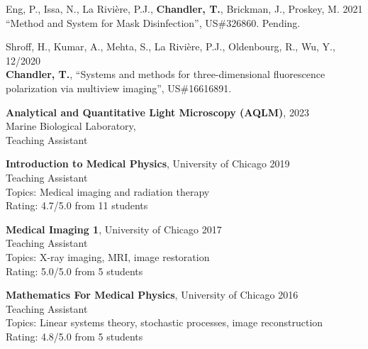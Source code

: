 \documentclass[12pt,letterpaper]{article}
\begin{document}
\begin{benumerate}{2}
  \item{Eng, P., Issa, N., La Rivi\`ere, P.J., \textbf{Chandler, T.}, Brickman, J., Proskey, M. \hfill 2021\\ ``Method and System for Mask Disinfection'', US\#326860. Pending. }
\item{Shroff, H., Kumar, A., Mehta, S., La Rivi\`ere, P.J., Oldenbourg, R., Wu, Y., \hfill 12/2020\\ \textbf{Chandler, T.}, ``Systems and methods for three-dimensional fluorescence\\ polarization via multiview imaging'', US\#16616891.}
\end{benumerate}

\begin{benumerate}{4}
\item
  \textbf{Analytical and Quantitative Light Microscopy (AQLM)}, \hfill 2023\\
  Marine Biological Laboratory,\\
  Teaching Assistant

\item
  \textbf{Introduction to Medical Physics}, University of Chicago \hfill 2019\\
  Teaching Assistant\\
  Topics: Medical imaging and radiation therapy\\
  Rating: 4.7/5.0 from 11 students
\item
  \textbf{Medical Imaging 1}, University of Chicago \hfill 2017\\
  Teaching Assistant\\
  Topics: X-ray imaging, MRI, image restoration\\
  Rating: 5.0/5.0 from 5 students
\item
  \textbf{Mathematics For Medical Physics}, University of Chicago \hfill 2016\\
  Teaching Assistant\\
  Topics: Linear systems theory, stochastic processes, image reconstruction\\
  Rating: 4.8/5.0 from 5 students
\end{benumerate}
\end{document}
